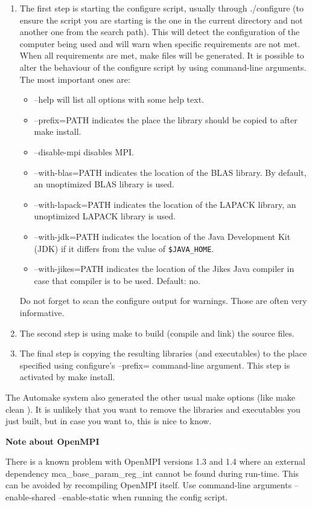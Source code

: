\begin{enumerate}
	\item The first step is starting the configure script, usually through ./configure (to ensure the script you are starting is the one in the current directory and not another one from the search path). This will detect the configuration of the computer being used and will warn when specific requirements are not met. When all requirements are met, make files will be generated. It is possible to alter the behaviour of the configure script by using command-line arguments. The most important ones are: 
	\begin{itemize}
		\item --help will list all options with some help text.
		\item --prefix=PATH indicates the place the library should be copied to after make install.
		\item --disable-mpi disables MPI.
		\item --with-blas=PATH indicates the location of the BLAS library. By default, an unoptimized BLAS library is used.
		\item --with-lapack=PATH indicates the location of the LAPACK library, an unoptimized LAPACK library is used.
		\item --with-jdk=PATH indicates the location of the Java Development Kit (JDK) if it differs from the value of \verb|$JAVA_HOME|.
		\item --with-jikes=PATH indicates the location of the Jikes Java compiler in case that compiler is to be used. Default: no.
	\end{itemize}
	Do not forget to scan the configure output for warnings. Those are often very informative. 
\item The second step is using make to build (compile and link) the source files.
\item The final step is copying the resulting libraries (and executables) to the place specified using configure's --prefix= command-line argument. This step is activated by make install. 
\end{enumerate}

The Automake system also generated the other usual make options (like make clean ). It is unlikely that you want to remove the libraries and executables you just built, but in case you want to, this is nice to know. 

\textbf{Note about OpenMPI}

There is a known problem with OpenMPI versions 1.3 and 1.4 where an external dependency mca\_base\_param\_reg\_int cannot be found during run-time. This can be avoided by recompiling OpenMPI itself. Use command-line arguments --enable-shared --enable-static when running the config script. 

